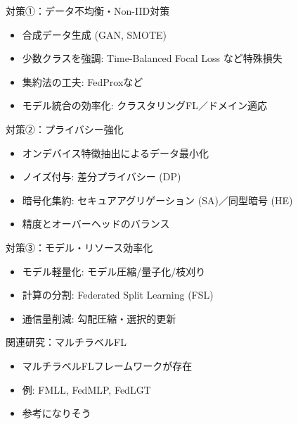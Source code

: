 \documentclass[unicode,12pt,aspectratio=169,dvipdfmx]{beamer}
\begin{document}
\begin{frame}{対策①：データ不均衡・Non-IID対策}
  \begin{itemize}
    \item 合成データ生成 (GAN, SMOTE)
    \item 少数クラスを強調: Time-Balanced Focal Loss\cite{TBFL} など特殊損失
    \item 集約法の工夫: FedProx\cite{FedProx}など
    \item モデル統合の効率化: クラスタリングFL／ドメイン適応
  \end{itemize}
\end{frame}
\begin{frame}{対策②：プライバシー強化}
  \begin{itemize}
    \item オンデバイス特徴抽出によるデータ最小化
    \item ノイズ付与: 差分プライバシー (DP)
    \item 暗号化集約: セキュアアグリゲーション (SA)／同型暗号 (HE)
    \item 精度とオーバーヘッドのバランス
  \end{itemize}
\end{frame}
\begin{frame}{対策③：モデル・リソース効率化}
  \begin{itemize}
    \item モデル軽量化: モデル圧縮/量子化/枝刈り
    \item 計算の分割: Federated Split Learning (FSL)\cite{FSL}
    \item 通信量削減: 勾配圧縮・選択的更新
  \end{itemize}
\end{frame}
\begin{frame}{関連研究：マルチラベルFL}
  \begin{itemize}
    \item マルチラベルFLフレームワークが存在
    \item 例: FMLL\cite{FMLL}, FedMLP\cite{FedMLP}, FedLGT\cite{FedLGT}
    \item 参考になりそう
  \end{itemize}
\end{frame}
\end{document}
